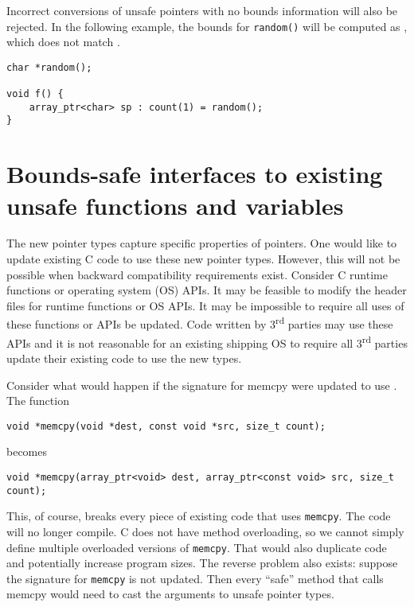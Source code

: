 Incorrect conversions of unsafe pointers with no bounds information
will also be rejected.  In the following example, the bounds for 
\texttt{random()} will be computed as \boundsnone, which does
not match .
\begin{verbatim}
char *random();

void f() {
    array_ptr<char> sp : count(1) = random(); 
}
\end{verbatim}

\section{Bounds-safe interfaces to existing unsafe functions and variables}
\label{section:function-bounds-safe-interfaces}

The new pointer types capture specific properties of pointers. One would
like to update existing C code to use these new pointer types. However,
this will not be possible when backward compatibility requirements
exist. Consider C runtime functions or operating system (OS) APIs. 
It may be feasible to modify the header files for runtime functions or OS APIs. 
It may be
impossible to require all uses of these functions or APIs be updated.
Code written by 3\textsuperscript{rd} parties may use these APIs and it
is not reasonable for an existing shipping OS to require all
3\textsuperscript{rd} parties update their existing code to use the new
types.

Consider what would happen if the signature for memcpy were updated to
use \arrayptr. The function

\begin{verbatim}
void *memcpy(void *dest, const void *src, size_t count);
\end{verbatim}

becomes

\begin{verbatim}
void *memcpy(array_ptr<void> dest, array_ptr<const void> src, size_t count);
\end{verbatim}

This, of course, breaks every piece of existing code that uses \texttt{memcpy}.
The code will no longer compile. C does not have method overloading, so
we cannot simply define multiple overloaded versions of \texttt{memcpy}. That
would also duplicate code and potentially increase program sizes.
The reverse problem also exists: suppose the signature for \texttt{memcpy} is not
updated. Then every ``safe'' method that calls memcpy would need to cast
the arguments to unsafe pointer types.

